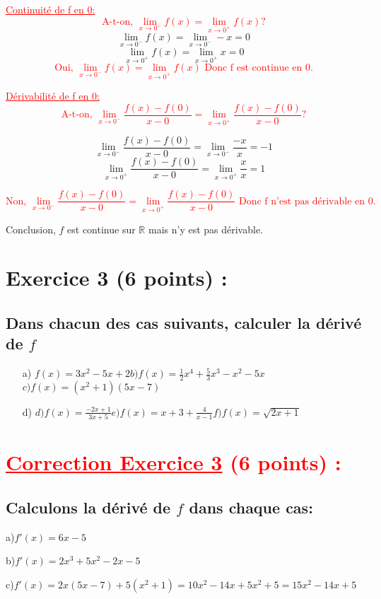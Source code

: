 \documentclass[12pt]{article}
\begin{document}
\textcolor{red}{\underline{Continuité de f en 0:}}
\textcolor{red}{\[\text{A-t-on, } \lim_{x \to 0^{-}}f(x)=\lim_{x \to 0^{+}}f(x) ?\]}
\[\lim_{x \to 0^{-}}f(x)=\lim_{x \to 0^{-}}-x=0\]
\[\lim_{x \to 0^{+}}f(x)=\lim_{x \to 0^{+}}x=0\]
\textcolor{red}{\[\text{Oui, } \lim_{x \to 0^{-}}f(x)=\lim_{x \to 0^{+}}f(x)\text{ Donc f est continue en 0.}\]}

\textcolor{red}{\underline{Dérivabilité de f en 0:}}
\textcolor{red}{\[\text{A-t-on, } \lim_{x \to 0^{-}}\frac{f(x)-f(0)}{x-0}=\lim_{x \to 0^{+}}\frac{f(x)-f(0)}{x-0}?\]}

\[\lim_{x \to 0^{-}}\frac{f(x)-f(0)}{x-0}=\lim_{x \to 0^{-}}\frac{-x}{x}=-1\]
\[\lim_{x \to 0^{+}}\frac{f(x)-f(0)}{x-0}=\lim_{x \to 0^{+}}\frac{x}{x}=1\]

\textcolor{red}{\[\text{Non, } \lim_{x \to 0^{-}}\frac{f(x)-f(0)}{x-0}=\lim_{x \to 0^{+}}\frac{f(x)-f(0)}{x-0}\text{ Donc f n'est  pas dérivable en 0. }\]}

Conclusion, $f$ est continue sur $\mathbb{R}$ mais n'y est pas dérivable.
\section*{Exercice 3 (6 points) :}
\subsection*{ Dans chacun des cas suivants, calculer la dérivé de $f$}
\begin{itemize}
\item[a)]$f(x)=3x^{2}-5x+2$\quad\quad $b)f(x)=\frac{1}{2}x^{4}+\frac{5}{3}x^{3}-x^{2}-5x$\quad\quad $c)f(x)=(x^{2}+1)(5x-7)$
\item[d)]$d)f(x)=\frac{-2x+1}{3x+5}$\quad\quad $e)f(x)=x+3+\frac{4}{x-1}$\quad\quad $f)f(x)=\sqrt{2x+1}$
\end{itemize}
\section*{\textcolor{red}{\underline{Correction Exercice 3} (6 points) :}}
\subsection*{ Calculons la dérivé de $f$ dans chaque cas:}
a)$f'(x)=6x-5$

b)$f'(x)=2x^{3}+5x^{2}-2x-5$ 

c)$f'(x)=2x(5x-7)+5(x^{2}+1)=10x^{2}-14x+5x^{2}+5=15x^{2}-14x+5$
\end{document}
